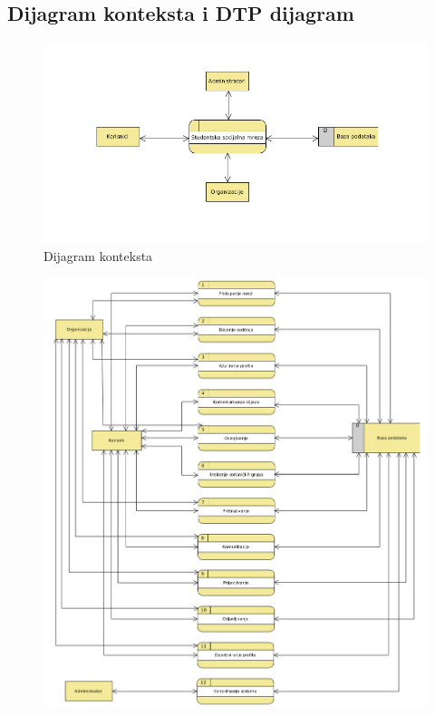 \subsection{Dijagram konteksta i DTP dijagram}
\begin{figure}[h!]
    \centerline{\includegraphics[scale=0.8]{slike/dijagram_konteksta.png}}
    \caption{Dijagram konteksta}
    \label{fig:my_label}
\end{figure}

\clearpage

\begin{figure}[h!]
		\centerline{\includegraphics[scale=1.8]{slike/dtp.png}}
\end{figure}

\clearpage